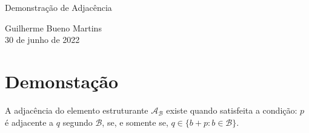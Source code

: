 \documentclass[11pt]{article}
\begin{document}
    \LARGE
    \centering
    Demonstração de Adjacência
    \vspace{0.25in}

    \large
    Guilherme Bueno Martins\\
    30 de junho de 2022\\
    \vspace{0.5in}
    \justifying


    \section{Demonstação}\label{sec:demonstacao}


    A adjacência do elemento estruturante $\mathcal{A}_{\mathcal{B}}$ existe quando satisfeita a condição: $p$ é adjacente a $q$ segundo $\mathcal{B}$, se, e somente se, $q \in \{b + p: b \in \mathcal{B}\}$.
\end{document}
